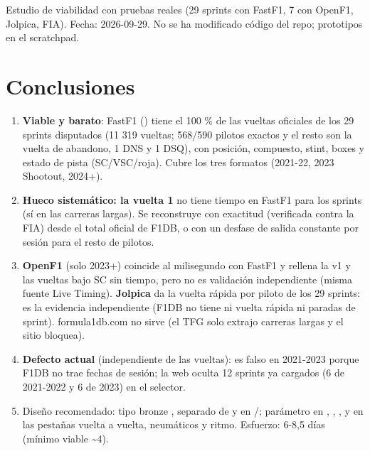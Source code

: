 \begin{nota}
Estudio de viabilidad con pruebas reales (29 sprints con FastF1, 7 con OpenF1, Jolpica, FIA). Fecha: 2026-09-29. No se ha modificado código del repo; prototipos en el scratchpad.
\end{nota}

\section{Conclusiones}

\begin{enumerate}
\item \textbf{Viable y barato}: FastF1 () tiene el 100 \% de las vueltas oficiales de los 29 sprints disputados (11 319 vueltas; 568/590 pilotos exactos y el resto son la vuelta de abandono, 1 DNS y 1 DSQ), con posición, compuesto, stint, boxes y estado de pista (SC/VSC/roja). Cubre los tres formatos (2021-22, 2023 Shootout, 2024+).
\item \textbf{Hueco sistemático: la vuelta 1} no tiene tiempo en FastF1 para los sprints (sí en las carreras largas). Se reconstruye con exactitud (verificada contra la FIA) desde el total oficial de F1DB, o con un desfase de salida constante por sesión para el resto de pilotos.
\item \textbf{OpenF1} (solo 2023+) coincide al milisegundo con FastF1 y rellena la v1 y las vueltas bajo SC sin tiempo, pero no es validación independiente (misma fuente Live Timing). \textbf{Jolpica} da la vuelta rápida por piloto de los 29 sprints: es la evidencia independiente (F1DB no tiene ni vuelta rápida ni paradas de sprint). formula1db.com no sirve (el TFG solo extrajo carreras largas y el sitio bloquea).
\item \textbf{Defecto actual} (independiente de las vueltas):  es falso en 2021-2023 porque F1DB no trae fechas de sesión; la web oculta 12 sprints ya cargados (6 de 2021-2022 y 6 de 2023) en el selector.
\item Diseño recomendado: tipo bronze ,  separado de  y  en /; parámetro  en , , , y  en las pestañas vuelta a vuelta, neumáticos y ritmo. Esfuerzo: 6-8,5 días (mínimo viable \textasciitilde{}4).
\end{enumerate}

